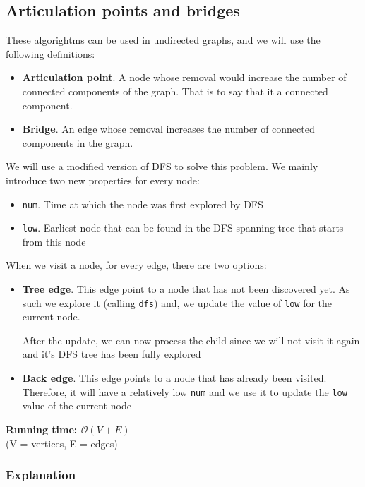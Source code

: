 \documentclass[12pt]{report}
\begin{document}
\subsection{Articulation points and bridges}
These algorightms can be used in undirected graphs, and we
will use the following definitions:
\begin{itemize}
	\def\itemsep{0 pt}
	\item \textbf{Articulation point}. A node whose removal would increase the number
		of connected components of the graph. That  is to say
		that it  a connected component.
	\item \textbf{Bridge}. An edge whose removal increases the number of 
		connected components in the graph.
\end{itemize}
We will use a modified version of DFS to solve this problem. We mainly introduce two new
properties for every node:
\begin{itemize}
	\def\itemsep{0 pt}
	\item \texttt{num}. Time at which the node was first explored by DFS
	\item \texttt{low}. Earliest node that can be found in the DFS spanning 
		tree that starts from this node
\end{itemize}
When we visit a node, for every edge, there are two options:
\begin{itemize}
\def \itemsep{0pt}
	\item \textbf{Tree edge}. This edge point to a node that has not been 
		discovered yet. As such we explore it (calling \texttt{dfs})
		and, we update the value of \texttt{low} for the current
		node. 

		After the update, we can now process the child since we will
		not visit it again and it's DFS tree has been fully explored

	\item \textbf{Back edge}. This edge points to a node that has already
		been visited. Therefore, it will have a relatively low 
		\texttt{num} and we use it to update the \texttt{low}
		value of the current node
\end{itemize}
\newpage
{}
\noindent \textbf{\boldmath Running time: $\mathcal{O}(V+E)$}
\\ {\small (V = vertices, E = edges)}
\subsubsection*{Explanation}
\end{document}
